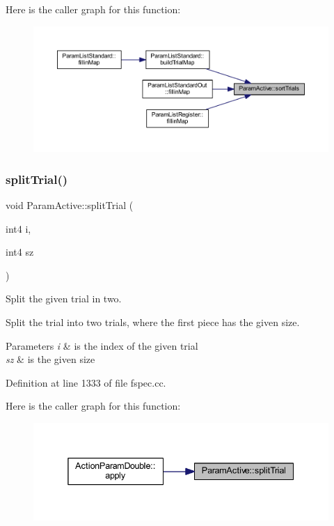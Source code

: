 Here is the caller graph for this function\+:
\nopagebreak
\begin{figure}[H]
\begin{center}
\leavevmode
\includegraphics[width=350pt]{class_param_active_ac0e9c62853e05738a55adfec7f626726_icgraph}
\end{center}
\end{figure}
\mbox{\label{class_param_active_add969ad5cdac4ac6dab2bd7e6b7b3ca5}} 
\subsubsection{\texorpdfstring{splitTrial()}{splitTrial()}}
{\footnotesize\ttfamily void Param\+Active\+::split\+Trial (\begin{DoxyParamCaption}\item[{int4}]{i,  }\item[{int4}]{sz }\end{DoxyParamCaption})}



Split the given trial in two. 

Split the trial into two trials, where the first piece has the given size. 
\begin{DoxyParams}{Parameters}
{\em i} & is the index of the given trial \\
\hline
{\em sz} & is the given size \\
\hline
\end{DoxyParams}


Definition at line 1333 of file fspec.\+cc.

Here is the caller graph for this function\+:
\nopagebreak
\begin{figure}[H]
\begin{center}
\leavevmode
\includegraphics[width=338pt]{class_param_active_add969ad5cdac4ac6dab2bd7e6b7b3ca5_icgraph}
\end{center}
\end{figure}
\mbox{\label{class_param_active_aa8aaa478177b4ce6d94c4a988059ab3f}} 
